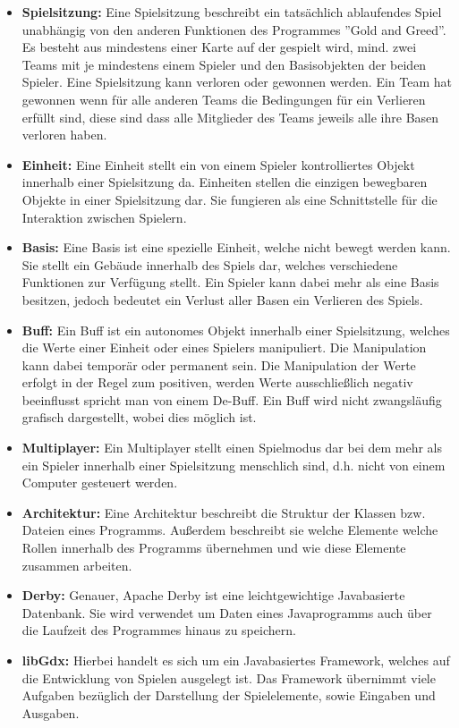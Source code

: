 \documentclass[fontsize=12pt,paper=a4,twoside]{scrartcl}
\begin{document}
\begin{itemize}
\item \textbf{Spielsitzung:} Eine Spielsitzung beschreibt ein tatsächlich ablaufendes Spiel unabhängig von den anderen Funktionen des Programmes ''Gold and Greed''. Es besteht aus mindestens einer Karte auf der gespielt wird, mind. zwei Teams mit je mindestens einem Spieler und den Basisobjekten der beiden Spieler. Eine Spielsitzung kann verloren oder gewonnen werden. Ein Team hat gewonnen wenn für alle anderen Teams die Bedingungen für ein Verlieren erfüllt sind, diese sind dass alle Mitglieder des Teams jeweils alle ihre Basen verloren haben.
\item \textbf{Einheit:} Eine Einheit stellt ein von einem Spieler kontrolliertes Objekt innerhalb einer Spielsitzung da. Einheiten stellen die einzigen bewegbaren Objekte in einer Spielsitzung dar. Sie fungieren als eine Schnittstelle für die Interaktion zwischen Spielern.
\item \textbf{Basis:} Eine Basis ist eine spezielle Einheit, welche nicht bewegt werden kann. Sie stellt ein Gebäude innerhalb des Spiels dar, welches verschiedene Funktionen zur Verfügung stellt. Ein Spieler kann dabei mehr als eine Basis besitzen, jedoch bedeutet ein Verlust aller Basen ein Verlieren des Spiels.  
\item \textbf{Buff:} Ein Buff ist ein autonomes Objekt innerhalb einer Spielsitzung, welches die Werte einer Einheit oder eines Spielers manipuliert. Die Manipulation kann dabei temporär oder permanent sein. Die Manipulation der Werte erfolgt in der Regel zum positiven, werden Werte ausschließlich negativ beeinflusst spricht man von einem De-Buff. Ein Buff wird nicht zwangsläufig grafisch dargestellt, wobei dies möglich ist.
\item \textbf{Multiplayer:} Ein Multiplayer stellt einen Spielmodus dar bei dem mehr als ein Spieler innerhalb einer Spielsitzung menschlich sind, d.h. nicht von einem Computer gesteuert werden.
\item \textbf{Architektur:} Eine Architektur beschreibt die Struktur der Klassen bzw. Dateien eines Programms. Außerdem beschreibt sie welche Elemente welche Rollen innerhalb des Programms übernehmen und wie diese Elemente zusammen arbeiten.
\item \textbf{Derby:} Genauer, Apache Derby ist eine leichtgewichtige Javabasierte Datenbank. Sie wird verwendet um Daten eines Javaprogramms auch über die Laufzeit des Programmes hinaus zu speichern.
\item \textbf{libGdx:} Hierbei handelt es sich um ein Javabasiertes Framework, welches auf die Entwicklung von Spielen ausgelegt ist. Das Framework übernimmt viele Aufgaben bezüglich der Darstellung der Spielelemente, sowie Eingaben und Ausgaben.

\end{itemize}
\end{document}
